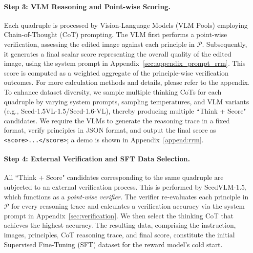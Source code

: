 \vspace{-1.0em}
\paragraph{Step 3: VLM Reasoning and Point-wise Scoring.}
Each quadruple is processed by Vision-Language Models (VLM Pools) employing Chain-of-Thought (CoT) prompting. The VLM first performs a point-wise verification, assessing the edited image against each principle in $\mathcal{P}$. Subsequently, it generates a final scalar score representing the overall quality of the edited image, using the system prompt in Appendix~\ref{sec:appendix_prompt_rrm}. This score is computed as a weighted aggregate of the principle-wise verification outcomes. For more calculation methods and details, please refer to the appendix.
To enhance dataset diversity, we sample multiple thinking CoTs for each quadruple by varying system prompts, sampling temperatures, and VLM variants (e.g., Seed-1.5VL-1.5/Seed-1.6-VL), thereby producing multiple ``Think + Score" candidates.
We require the VLMs to generate the reasoning trace in a fixed format, verify principles in JSON format, and output the final score as \texttt{<score>...</score>}; a demo is shown in Appendix~\ref{append:rrm}.

\paragraph{Step 4: External Verification and SFT Data Selection.}
All ``Think + Score" candidates corresponding to the same quadruple are subjected to an external verification process. This is performed by SeedVLM-1.5, which functions as a \emph{point-wise verifier}. The verifier re-evaluates each principle in $\mathcal{P}$ for every reasoning trace and calculates a verification accuracy via the system prompt in Appendix~\ref{sec:verification}. We then select the thinking CoT that achieves the highest accuracy. The resulting data, comprising the instruction, images, principles, CoT reasoning trace, and final score, constitute the initial Supervised Fine-Tuning (SFT) dataset for the reward model's cold start.

